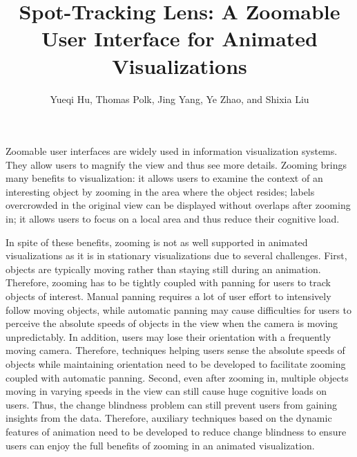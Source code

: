 \documentclass[review]{vgtc}                 %
\title{Spot-Tracking Lens: A Zoomable User Interface for Animated Visualizations}
\author{Yueqi Hu, Thomas Polk, Jing Yang, Ye Zhao, and Shixia Liu}
\begin{document}


\maketitle


Zoomable user interfaces \cite{bederson1994pad,cockburn2008review,perlin1993pad} are widely used in information visualization systems. They allow users to magnify the view and thus see more details. Zooming brings many benefits to visualization: it allows users to examine the context of an interesting object by zooming in the area where the object resides; labels overcrowded in the original view can be displayed without overlaps after zooming in; it allows users to focus on a local area and thus reduce their cognitive load.

In spite of these benefits, zooming is not as well supported in animated visualizations as it is in stationary visualizations due to several challenges. First, objects are typically moving rather than staying still during an animation. Therefore, zooming has to be tightly coupled with panning for users to track objects of interest. Manual panning requires a lot of user effort to intensively follow moving objects, while automatic panning may cause difficulties for users to perceive the absolute speeds of objects in the view when the camera is moving unpredictably. In addition, users may lose their orientation with a frequently moving camera. Therefore, techniques helping users sense the absolute speeds of objects while maintaining orientation need to be developed to facilitate zooming coupled with automatic panning. Second, even after zooming in, multiple objects moving in varying speeds in the view can still cause huge cognitive loads on users.  Thus, the change blindness problem \cite{nowell_change_2001} can still prevent users from gaining insights from the data. Therefore,  auxiliary techniques based on the dynamic features of animation need to be developed to reduce change blindness to ensure users can enjoy the full benefits of zooming in an animated visualization.
\end{document}
